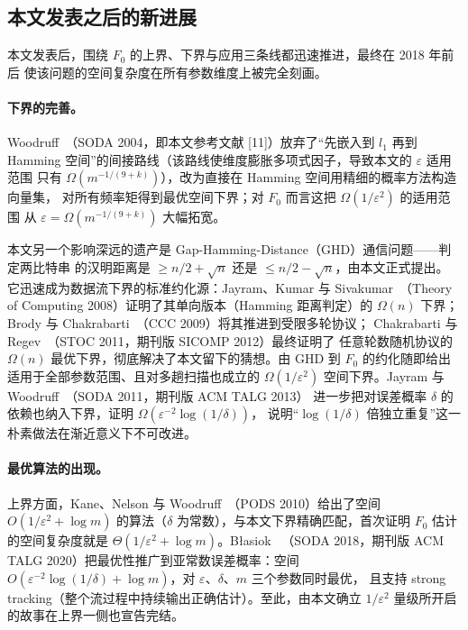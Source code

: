 \documentclass[UTF8, 11pt, a4paper, linestretch=1.15]{ctexart}
\theoremstyle{zhstyle}
\newcommand{\eps}{\varepsilon}
\newcommand{\Fzero}{F_0}
\begin{document}
	\subsection{本文发表之后的新进展}
	
	本文发表后，围绕 $\Fzero$ 的上界、下界与应用三条线都迅速推进，最终在 2018 年前后
	使该问题的空间复杂度在所有参数维度上被完全刻画。
	
	\paragraph{下界的完善。}
	Woodruff~\cite{Woo04}（SODA 2004，即本文参考文献 [11]）放弃了“先嵌入到 $l_1$ 再到
	Hamming 空间”的间接路线（该路线使维度膨胀多项式因子，导致本文的 $\eps$ 适用范围
	只有 $\Omega(m^{-1/(9+k)})$），改为直接在 Hamming 空间用精细的概率方法构造向量集，
	对所有频率矩得到最优空间下界；对 $\Fzero$ 而言这把 $\Omega(1/\eps^2)$ 的适用范围
	从 $\eps = \Omega(m^{-1/(9+k)})$ 大幅拓宽。
	
	本文另一个影响深远的遗产是 Gap-Hamming-Distance（GHD）通信问题——判定两比特串
	的汉明距离是 $\geq n/2 + \sqrt{n}$ 还是 $\leq n/2 - \sqrt{n}$，由本文正式提出。
	它迅速成为数据流下界的标准约化源：Jayram、Kumar 与 Sivakumar~\cite{JKS08}（Theory
	of Computing 2008）证明了其单向版本（Hamming 距离判定）的 $\Omega(n)$ 下界；
	Brody 与 Chakrabarti~\cite{BC09}（CCC 2009）将其推进到受限多轮协议；
	Chakrabarti 与 Regev~\cite{CR11}（STOC 2011，期刊版 SICOMP 2012）最终证明了
	任意轮数随机协议的 $\Omega(n)$ 最优下界，彻底解决了本文留下的猜想。由 GHD 到
	$\Fzero$ 的约化随即给出适用于全部参数范围、且对多趟扫描也成立的 $\Omega(1/\eps^2)$
	空间下界。Jayram 与 Woodruff~\cite{JW13}（SODA 2011，期刊版 ACM TALG 2013）
	进一步把对误差概率 $\delta$ 的依赖也纳入下界，证明 $\Omega(\eps^{-2}\log(1/\delta))$，
	说明“$\log(1/\delta)$ 倍独立重复”这一朴素做法在渐近意义下不可改进。
	
	\paragraph{最优算法的出现。}
	上界方面，Kane、Nelson 与 Woodruff~\cite{KNW10}（PODS 2010）给出了空间
	$O(1/\eps^2 + \log m)$ 的算法（$\delta$ 为常数），与本文下界精确匹配，首次证明
	$\Fzero$ 估计的空间复杂度就是 $\Theta(1/\eps^2 + \log m)$。Błasiok~\cite{Bla18}
	（SODA 2018，期刊版 ACM TALG 2020）把最优性推广到亚常数误差概率：空间
	$O(\eps^{-2}\log(1/\delta) + \log m)$，对 $\eps$、$\delta$、$m$ 三个参数同时最优，
	且支持 strong tracking（整个流过程中持续输出正确估计）。至此，由本文确立
	$1/\eps^2$ 量级所开启的故事在上界一侧也宣告完结。
	
\end{document}

